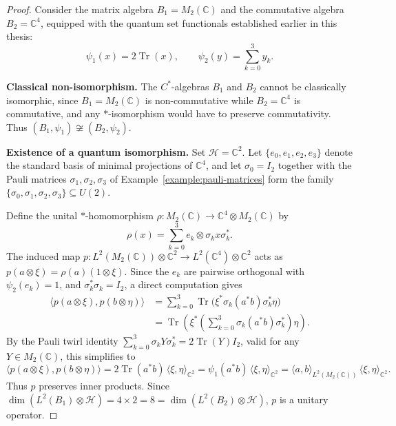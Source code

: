 \begin{proof}
    Consider the matrix algebra \( B_1 = M_2(\mathbb{C}) \) and the
    commutative algebra \( B_2 = \mathbb{C}^4 \), equipped with the
    quantum set functionals established earlier in this thesis:
    \[
        \psi_1(x) = 2\operatorname{Tr}(x), \qquad
        \psi_2(y) = \sum_{k=0}^3 y_k.
    \]

    \textbf{Classical non-isomorphism.}
    The \( C^* \)-algebras \( B_1 \) and \( B_2 \) cannot be
    classically isomorphic, since \( B_1 = M_2(\mathbb{C}) \) is
    non-commutative while \( B_2 = \mathbb{C}^4 \) is commutative, and
    any \( * \)-isomorphism would have to preserve commutativity.
    Thus \( (B_1,\psi_1) \not\cong (B_2,\psi_2) \).

    \textbf{Existence of a quantum isomorphism.}
    Set \( \mathcal{H} = \mathbb{C}^2 \). Let \( \{e_0,e_1,e_2,e_3\} \)
    denote the standard basis of minimal projections of
    \( \mathbb{C}^4 \), and let \( \sigma_0 = I_2 \) together with
    the Pauli matrices \( \sigma_1,\sigma_2,\sigma_3 \) of
    Example~\ref{example:pauli-matrices} form the family
    \( \{\sigma_0,\sigma_1,\sigma_2,\sigma_3\} \subseteq U(2) \).

    Define the unital \( * \)-homomorphism
    \( \rho \colon M_2(\mathbb{C}) \to \mathbb{C}^4 \otimes M_2(\mathbb{C}) \)
    by
    \[
        \rho(x) = \sum_{k=0}^3 e_k \otimes \sigma_k x \sigma_k^*.
    \]
    The induced map
    \( p \colon L^2(M_2(\mathbb{C})) \otimes \mathbb{C}^2 \to
    L^2(\mathbb{C}^4) \otimes \mathbb{C}^2 \) acts as
    \( p(a \otimes \xi) = \rho(a)(1 \otimes \xi) \). Since the
    \( e_k \) are pairwise orthogonal with \( \psi_2(e_k) = 1 \), and
    \( \sigma_k^*\sigma_k = I_2 \), a direct computation gives
    \begin{align*}
        \langle p(a \otimes \xi), p(b \otimes \eta) \rangle
        &= \sum_{k=0}^3 \operatorname{Tr}\big( \xi^* \sigma_k (a^*b)
        \sigma_k^* \eta \big) \\
        &= \operatorname{Tr}\left( \xi^* \left( \sum_{k=0}^3 \sigma_k
        (a^*b) \sigma_k^* \right) \eta \right).
    \end{align*}
    By the Pauli twirl identity \( \sum_{k=0}^3 \sigma_k Y \sigma_k^* =
    2\operatorname{Tr}(Y) I_2 \), valid for any \( Y \in M_2(\mathbb{C}) \),
    this simplifies to
    \[
        \langle p(a \otimes \xi), p(b \otimes \eta) \rangle =
        2\operatorname{Tr}(a^*b)\, \langle \xi, \eta \rangle_{\mathbb{C}^2}
        = \psi_1(a^*b)\, \langle \xi, \eta \rangle_{\mathbb{C}^2}
        = \langle a, b \rangle_{L^2(M_2(\mathbb{C}))}\, \langle \xi,
        \eta \rangle_{\mathbb{C}^2}.
    \]
    Thus \( p \) preserves inner products. Since
    \( \dim(L^2(B_1) \otimes \mathcal{H}) = 4 \times 2 = 8 =
    \dim(L^2(B_2) \otimes \mathcal{H}) \), \( p \) is a unitary operator.


\end{proof}
